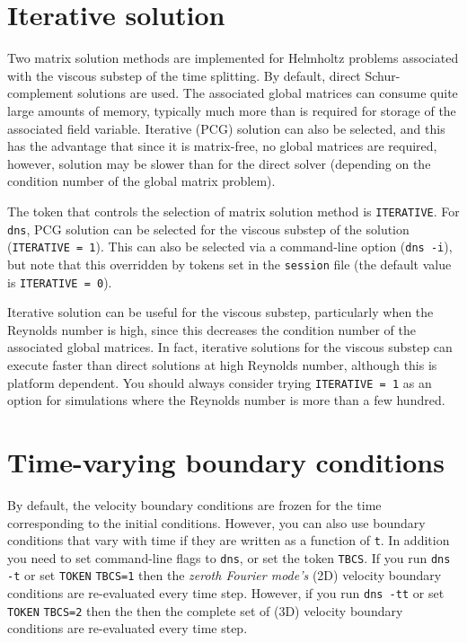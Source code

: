 \documentclass[11pt,a4paper]{report}
\begin{document}
\section{Iterative solution}
\label{sec.iterative}

Two matrix solution methods are implemented for Helmholtz problems
associated with the viscous substep of the time splitting.  By
default, direct Schur-complement solutions are used.  The associated
global matrices can consume quite large amounts of memory, typically
much more than is required for storage of the associated field
variable.  Iterative (PCG) solution can also be selected, and this has
the advantage that since it is matrix-free, no global matrices are
required, however, solution may be slower than for the direct solver
(depending on the condition number of the global matrix problem).

The token that controls the selection of matrix solution method is
\verb+ITERATIVE+.  For \verb+dns+, PCG solution can be selected for
the viscous substep of the solution (\verb+ITERATIVE = 1+).  This can
also be selected via a command-line option (\verb+dns -i+), but note
that this overridden by tokens set in the \verb+session+ file (the
default value is \verb+ITERATIVE = 0+).

Iterative solution can be useful for the viscous substep, particularly
when the Reynolds number is high, since this decreases the condition
number of the associated global matrices.  In fact, iterative
solutions for the viscous substep can execute faster than direct
solutions at high Reynolds number, although this is platform
dependent. You should always consider trying \verb+ITERATIVE = 1+ as
an option for simulations where the Reynolds number is more than a few
hundred.

\section{Time-varying boundary conditions}
\label{sec.tbcs}

By default, the velocity boundary conditions are frozen for the time
corresponding to the initial conditions. However, you can also use
boundary conditions that vary with time if they are written as a
function of \texttt{t}. In addition you need to set command-line flags
to \texttt{dns}, or set the token \texttt{TBCS}. If you run
\verb+dns -t+ or set \texttt{TOKEN} \verb+TBCS=1+ then the
\emph{zeroth Fourier mode's} (2D) velocity boundary conditions are
re-evaluated every time step.  However, if you run \verb+dns -tt+ or
set \texttt{TOKEN} \verb+TBCS=2+ then the then the complete set of
(3D) velocity boundary conditions are re-evaluated every time step.
\end{document}
